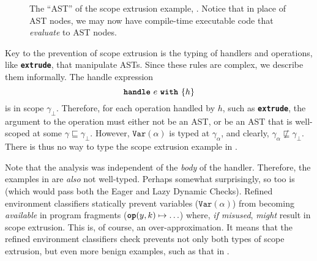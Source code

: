 \begin{figure}

\caption{The ``AST'' of the scope extrusion example, . Notice that in place of AST nodes, we may now have compile-time executable code that \textit{evaluate} to AST nodes.}
\label{fig:classifier-ast-scope-extrusion}
\end{figure}

Key to the prevention of scope extrusion is the typing of handlers and operations, like \textbf{\texttt{extrude}}, that manipulate ASTs. Since these rules are complex, we describe them informally. The handle expression
\[\textbf{\texttt{handle}} \,\, {e} \,\, \textbf{\texttt{with}} \,\, \{{h}\}\]
is in scope $\gamma_{\bot}$. Therefore, for each operation handled by $h$, such as \textbf{\texttt{extrude}}, the argument to the operation must either not be an AST, or be an AST that is well-scoped at some $\gamma \sqsubseteq \gamma_{\bot}$. 
However, $\texttt{Var}(\alpha)$ is typed at $\gamma_{\alpha}$, and clearly, $\gamma_{\alpha} \not\sqsubseteq \gamma_{\bot}$. There is thus no way to type the scope extrusion example in .

Note that the analysis was independent of the \textit{body} of the handler. Therefore, the examples in  are \textit{also} not well-typed. Perhaps somewhat surprisingly, so too is  (which would pass both the Eager and Lazy Dynamic Checks). Refined environment classifiers statically prevent variables ($\texttt{Var}(\alpha)$) from becoming \textit{available} in program fragments ($\texttt{\textbf{op}}(y, k) \mapsto \ldots$) where, \textit{if misused}, \textit{might} result in scope extrusion. This is, of course, an over-approximation. It means that the refined environment classifiers check prevents not only both types of scope extrusion, but even more benign examples, such as that in .

